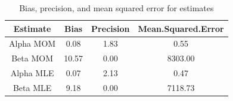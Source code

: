 \documentclass{article}\usepackage[]{graphicx}\usepackage[]{xcolor}
\begin{document}
\begin{table}[ht]
\centering
\begin{tabular}{|c|c|c|c|}
  \hline
Estimate & Bias & Precision & Mean.Squared.Error \\ 
  \hline
Alpha MOM & 0.08 & 1.83 & 0.55 \\ 
  Beta MOM & 10.57 & 0.00 & 8303.00 \\ 
  Alpha MLE & 0.07 & 2.13 & 0.47 \\ 
  Beta MLE & 9.18 & 0.00 & 7118.73 \\ 
   \hline
\end{tabular}
\caption{Bias, precision, and mean squared error for estimates} 
\label{precision.tab}
\end{table}
\end{document}
